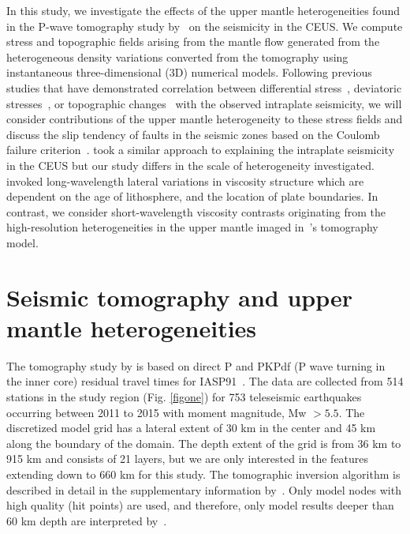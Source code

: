 \documentclass[draft,linenumbers]{agujournal2018}
\begin{document}
In this study, we investigate the effects of the upper mantle heterogeneities found in the P-wave tomography study by~\citet{Biryol_2016} on the seismicity in the CEUS. We compute stress and topographic fields  arising from the mantle flow generated from the heterogeneous density variations converted from the tomography using instantaneous three-dimensional (3D) numerical models. %
Following previous studies that have demonstrated correlation between differential stress~\citep[e.g.,][]{baird2010relationship, zhan2016stress},  deviatoric stresses~\citep[e.g.,][]{levandowski2016dense}, or topographic changes~\citep{becker2015western} with the observed intraplate seismicity, 
we will consider contributions of the upper mantle heterogeneity to these stress fields and discuss the slip tendency of faults in the seismic zones based on the Coulomb failure criterion~\citep[e.g.,][]{king1994static, freed2005earthquake, li2007stress}. \citet{ghosh2019role} took a similar approach to explaining the intraplate seismicity in the CEUS but our study differs in the scale of heterogeneity investigated. \citet{ghosh2019role} invoked long-wavelength lateral variations in viscosity structure  which are dependent on the age of lithosphere, and the location of plate boundaries. In contrast, we consider short-wavelength viscosity contrasts originating from the high-resolution heterogeneities in the upper mantle imaged in~\citet{Biryol_2016}\rq{}s tomography model. 


\section{Seismic tomography and upper mantle heterogeneities}

The tomography study by \citet{Biryol_2016} is based on direct P and PKPdf (P wave turning in the inner core) residual travel times for IASP91~\citep{kennett1991traveltimes}. The data are collected from 514 stations in the study region (Fig. \ref{figone}) for 753 teleseismic earthquakes occurring between 2011 to 2015 with moment magnitude, Mw $> 5.5$. The discretized model grid has a lateral extent of 30 km in the center and 45 km along the boundary of the domain. The depth extent of the grid is from 36 km to 915 km and consists of 21 layers, but we are only interested in the features extending down to 660 km for this study. The tomographic inversion algorithm is described in detail in the supplementary information by~\citet{Biryol_2016}. Only model nodes with high quality (hit points) are used, and therefore, only model results deeper than 60 km depth are interpreted by~\citet{Biryol_2016}.
    
\end{document}
